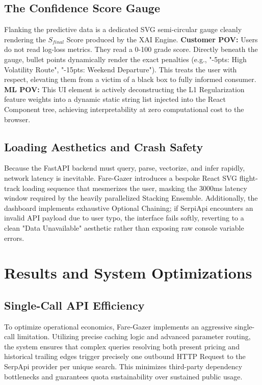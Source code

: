 \documentclass[12pt, a4paper]{article}
\begin{document}
\subsection{The Confidence Score Gauge}
Flanking the predictive data is a dedicated SVG semi-circular gauge cleanly rendering the $S_{final}$ Score produced by the XAI Engine.
\textbf{Customer POV:} Users do not read log-loss metrics. They read a 0-100 grade score. Directly beneath the gauge, bullet points dynamically render the exact penalties (e.g., "-5pts: High Volatility Route", "-15pts: Weekend Departure"). This treats the user with respect, elevating them from a victim of a black box to fully informed consumer.
\textbf{ML POV:} This UI element is actively deconstructing the L1 Regularization feature weights into a dynamic static string list injected into the React Component tree, achieving interpretability at zero computational cost to the browser.

\subsection{Loading Aesthetics and Crash Safety}
Because the FastAPI backend must query, parse, vectorize, and infer rapidly, network latency is inevitable. Fare-Gazer introduces a bespoke React SVG flight-track loading sequence that mesmerizes the user, masking the 3000ms latency window required by the heavily parallelized Stacking Ensemble. Additionally, the dashboard implements exhaustive Optional Chaining; if SerpiApi encounters an invalid API payload due to user typo, the interface fails softly, reverting to a clean "Data Unavailable" aesthetic rather than exposing raw console variable errors.

\newpage

\section{Results and System Optimizations}

\subsection{Single-Call API Efficiency}
To optimize operational economics, Fare-Gazer implements an aggressive single-call limitation. Utilizing precise caching logic and advanced parameter routing, the system ensures that complex queries resolving both present pricing and historical trailing edges trigger precisely one outbound HTTP Request to the SerpApi provider per unique search. This minimizes third-party dependency bottlenecks and guarantees quota sustainability over sustained public usage.
\end{document}
